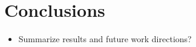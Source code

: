 \section{Conclusions}
\begin{itemize}
    \item Summarize results and future work directions?
\end{itemize}